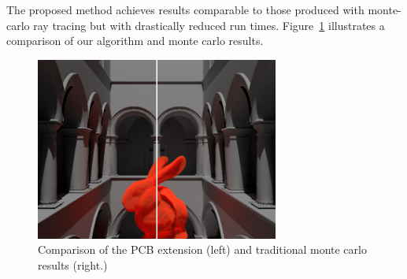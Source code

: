 \documentclass[runningheads]{llncs}
\begin{document}
  The proposed method achieves results comparable to those produced with monte-carlo ray tracing but with drastically reduced run times.  Figure~\ref{fig:compare} illustrates a comparison of our algorithm and monte carlo results.

\begin{figure}[h!]
    \centering
    \includegraphics[width=80mm]{img/compare.png}
    \caption{Comparison of the PCB extension (left) and traditional monte carlo results (right.)}
    \label{fig:compare}
\end{figure}







\end{document}

